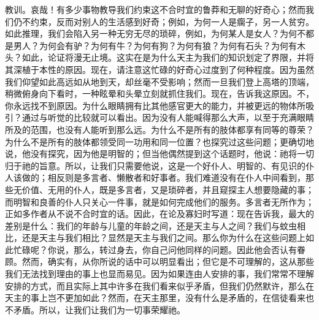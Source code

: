 教训。哀哉！有多少事物教导我们约束这不合时宜的鲁莽和无聊的好奇心；然而我们仍不约束，反而对别人的生活感到好奇；例如，为何一人是瘸子，另一人贫穷。如此推理，我们会陷入另一种无穷无尽的琐碎，例如，为何某人是女人？为何不都是男人？为何会有驴？为何有牛？为何有狗？为何有狼？为何有石头？为何有木头？如此，论证将漫无止境。这实在是为什么天主为我们的知识划定了界限，并将其深植于本性的原因。现在，请注意这忙碌的好奇心过度到了何种程度。因为虽然我们仰望如此高远如从地到天，却丝毫不受影响；然而一旦我们登上高塔的顶端，稍微俯身向下看时，一种眩晕和头晕立刻就抓住我们。现在，告诉我这原因。不，你永远找不到原因。为什么眼睛拥有比其他感官更大的能力，并被更远的物体所吸引？通过与听觉的比较就可以看出。因为没有人能喊得那么大声，以至于充满眼睛所及的范围，也没有人能听到那么远。为什么不是所有的肢体都享有同等的尊荣？为什么不是所有的肢体都领受同一功用和同一位置？也探究过这些问题；更确切地说，他没有探究，因为他是明智的；但当他偶然提到这个话题时，他说：祂将一切归于祂的旨意。所以，让我们只需要他说，这是一个好仆人、明智的、有见识的仆人该做的；相反则是多言者、懒散者和好事者。我们难道没有在仆人中间看到，那些无价值、无用的仆人，既是多言者，又是琐碎者，并且窥探主人想要隐藏的事；而明智和良善的仆人只关心一件事，就是如何完成他们的服务。多言者无所作为；正如多作者从不说不合时宜的话。因此，在论及寡妇时写道：现在告诉我，最大的差别是什么：我们的年龄与儿童的年龄之间，还是天主与人之间？我们与蚊虫相比，还是天主与我们相比？显然是天主与我们之间。那么你为什么在这些问题上如此忙碌呢？你说，那么，转过身去，你自己问他同样的问题。因此他会否认有眷顾。然而，确实有，从你所说的话中可以明显看出；但它是不可理解的，这从那些我们无法找到理由的事上也显而易见。因为如果连由人安排的事，我们常常不理解安排的方式，而且实际上其中许多在我们看来似乎矛盾，但我们仍然默许，那么在天主的事上岂不更加如此？然而，在天主那里，没有什么是矛盾的，在信徒看来也不矛盾。所以，让我们让我们为一切事荣耀祂。\par

